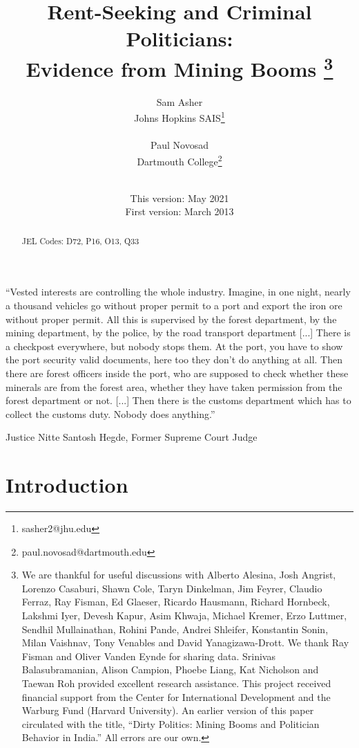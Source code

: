 \documentclass[12pt,letterpaper]{article}
\title{ Rent-Seeking and Criminal Politicians: \\ Evidence from Mining
  Booms \footnote{We are thankful for useful discussions with Alberto
    Alesina, Josh Angrist, Lorenzo Casaburi, Shawn Cole, Taryn
    Dinkelman, Jim Feyrer, Claudio Ferraz, Ray Fisman, Ed Glaeser,
    Ricardo Hausmann, Richard Hornbeck, Lakshmi Iyer, Devesh Kapur,
    Asim Khwaja, Michael Kremer, Erzo Luttmer, Sendhil Mullainathan,
    Rohini Pande, Andrei Shleifer, Konstantin Sonin, Milan Vaishnav,
    Tony Venables and David Yanagizawa-Drott. We thank
    Ray Fisman and Oliver Vanden Eynde for sharing data.  Srinivas Balasubramanian,
    Alison Campion, Phoebe Liang, Kat Nicholson and Taewan Roh provided excellent
    research assistance.  This project received financial support from
    the Center for International Development and the Warburg Fund
    (Harvard University). An earlier version of this paper circulated
    with the title, ``Dirty Politics: Mining Booms and Politician
    Behavior in India.'' All errors are our own.}}
\author{Sam Asher \\ Johns Hopkins SAIS\footnote{sasher2@jhu.edu}\\ \\ Paul
  Novosad\\Dartmouth College\footnote{paul.novosad@dartmouth.edu}\\ \\ }
\begin{document}
\date{This version: May 2021\\First version: March 2013}                      

\maketitle
\thispagestyle{empty}
\begin{abstract}
\doublespacing

  

  JEL Codes: D72, P16, O13, Q33

\end{abstract}

\newpage
\singlespacing

\begin{QUOTE}
  ``Vested interests are controlling the whole industry. Imagine, in one night, nearly a thousand vehicles go without proper permit to a port and export the iron ore without proper permit. All this is supervised by the forest department, by the mining department, by the police, by the road transport department [...] There is a checkpost everywhere, but nobody stops them. At the port, you have to show the port security valid documents, here too they don't do anything at all. Then there are forest officers inside the port, who are supposed to check whether these minerals are from the forest area, whether they have taken permission from the forest department or not. [...] Then there is the customs department which has to collect the customs duty. Nobody does anything.''
\end{QUOTE}
\begin{flushright} \small{Justice Nitte Santosh Hegde, Former Supreme Court Judge}
\end{flushright}

\doublespacing

\section{Introduction}
\label{sec:intro}
\end{document}
